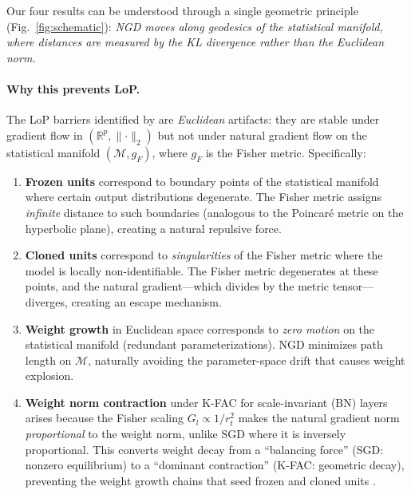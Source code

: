 \documentclass{article}
\providecommand{\R}{\mathbb{R}}
\providecommand{\norm}[1]{\lVert #1 \rVert}
\theoremstyle{plain}
\theoremstyle{definition}
\theoremstyle{remark}
\begin{document}
Our four results can be understood through a single geometric principle (Fig.~\ref{fig:schematic}): \emph{NGD moves along geodesics of the statistical manifold, where distances are measured by the KL divergence rather than the Euclidean norm.}

\paragraph{Why this prevents LoP.} The LoP barriers identified by \citet{joudaki2026barriers} are \emph{Euclidean} artifacts: they are stable under gradient flow in $(\R^p, \norm{\cdot}_2)$ but not under natural gradient flow on the statistical manifold $(\mathcal{M}, g_F)$, where $g_F$ is the Fisher metric. Specifically:

\begin{enumerate}
    \item \textbf{Frozen units} correspond to boundary points of the statistical manifold where certain output distributions degenerate. The Fisher metric assigns \emph{infinite} distance to such boundaries (analogous to the Poincar\'e metric on the hyperbolic plane), creating a natural repulsive force.
    
    \item \textbf{Cloned units} correspond to \emph{singularities} of the Fisher metric where the model is locally non-identifiable. The Fisher metric degenerates at these points, and the natural gradient---which divides by the metric tensor---diverges, creating an escape mechanism.
    
    \item \textbf{Weight growth} in Euclidean space corresponds to \emph{zero motion} on the statistical manifold (redundant parameterizations). NGD minimizes path length on $\mathcal{M}$, naturally avoiding the parameter-space drift that causes weight explosion.
    
    \item \textbf{Weight norm contraction} under K-FAC for scale-invariant (BN) layers arises because the Fisher scaling $G_l \propto 1/r_t^2$ makes the natural gradient norm \emph{proportional} to the weight norm, unlike SGD where it is inversely proportional. This converts weight decay from a ``balancing force'' (SGD: nonzero equilibrium) to a ``dominant contraction'' (K-FAC: geometric decay), preventing the weight growth chains that seed frozen and cloned units \citep{kosson2024rotational}.
\end{enumerate}
\end{document}
